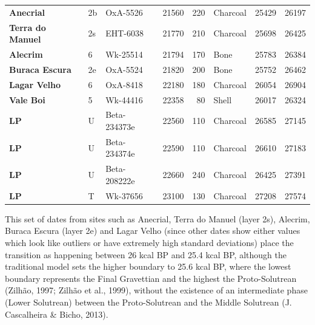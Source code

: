 \documentclass[12pt,twoside]{reedthesis}
\begin{document}
\begin{table}
\begin{tabular}[t]{>{\bfseries}lllrrlrr}
Anecrial & 2b & OxA-5526 & 21560 & 220 & Charcoal & 25429 & 26197\\
Terra do Manuel & 2s & EHT-6038 & 21770 & 210 & Charcoal & 25698 & 26425\\
Alecrim & 6 & Wk-25514 & 21794 & 170 & Bone & 25783 & 26384\\
Buraca Escura & 2e & OxA-5524 & 21820 & 200 & Bone & 25752 & 26462\\
\addlinespace
Lagar Velho & 6 & OxA-8418 & 22180 & 180 & Charcoal & 26054 & 26904\\
Vale Boi & 5 & Wk-44416 & 22358 & 80 & Shell & 26017 & 26324\\
LP & U & Beta-234373e & 22560 & 110 & Charcoal & 26585 & 27145\\
LP & U & Beta-234374e & 22590 & 110 & Charcoal & 26610 & 27183\\
LP & U & Beta-208222e & 22660 & 240 & Charcoal & 26425 & 27391\\
\addlinespace
LP & T & Wk-37656 & 23100 & 130 & Charcoal & 27208 & 27574\\
\bottomrule
\end{tabular}
\end{table}
This set of dates from sites such as Anecrial, Terra do Manuel (layer 2s), Alecrim, Buraca Escura (layer 2e) and Lagar Velho (since other dates show either values which look like outliers or have extremely high standard deviations) place the transition as happening between 26 kcal BP and 25.4 kcal BP, although the traditional model sets the higher boundary to 25.6 kcal BP, where the lowest boundary represents the Final Gravettian and the highest the Proto-Solutrean (Zilhão, 1997; Zilhão et al., 1999), without the existence of an intermediate phase (Lower Solutrean) between the Proto-Solutrean and the Middle Solutrean (J. Cascalheira \& Bicho, 2013).
\end{document}
